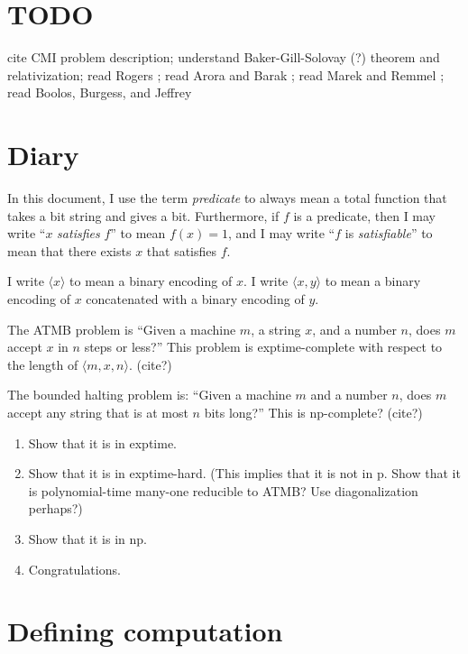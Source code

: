 \section{TODO}

cite CMI problem description;
understand Baker-Gill-Solovay (?) theorem and relativization;
read Rogers \cite{Rogers1987};
read Arora and Barak \cite{Arora2009};
read Marek and Remmel \cite{Marek2009};
read Boolos, Burgess, and Jeffrey \cite{Boolos2002}

\section{Diary}

In this document, I use the term \emph{predicate} to always mean
a total function that takes a bit string and gives a bit.
Furthermore, if $f$ is a predicate, then
I may write ``$x$ \emph{satisfies} $f$'' to mean $f(x) = 1$, and
I may write ``$f$ is \emph{satisfiable}'' to mean
that there exists $x$ that satisfies $f$.

\newcommand\encoding[1]{\langle#1\rangle}

I write $\encoding{x}$ to mean a binary encoding of $x$.
I write $\encoding{x,y}$ to mean a binary encoding of $x$
concatenated with a binary encoding of $y$.

The ATMB problem is ``Given a machine $m$, a string $x$,
and a number $n$,
does $m$ accept $x$ in $n$ steps or less?''
This problem is exptime-complete with respect to the length of
$\encoding{m,x,n}$. (cite?)

The bounded halting problem is:
``Given a machine $m$ and a number $n$,
does $m$ accept any string that is at most $n$ bits long?''
This is np-complete? (cite?)

\begin{enumerate}
\item Show that it is in exptime.
\item Show that it is in exptime-hard.
(This implies that it is not in p.
Show that it is polynomial-time many-one reducible to ATMB?
Use diagonalization perhaps?)
\item Show that it is in np.
\item Congratulations.
\end{enumerate}

\section{Defining computation}

